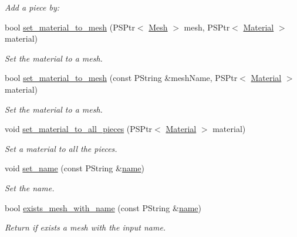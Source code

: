 \begin{DoxyCompactItemize}
\begin{DoxyCompactList}\small\item\em Add a piece by\+: \end{DoxyCompactList}\item 
bool \mbox{\hyperlink{classprz_1_1_model_ac68a6c012bdcaf9a24c275f7acf081bf}{set\+\_\+material\+\_\+to\+\_\+mesh}} (P\+S\+Ptr$<$ \mbox{\hyperlink{classprz_1_1_mesh}{Mesh}} $>$ mesh, P\+S\+Ptr$<$ \mbox{\hyperlink{classprz_1_1_material}{Material}} $>$ material)
\begin{DoxyCompactList}\small\item\em Set the material to a mesh. \end{DoxyCompactList}\item 
bool \mbox{\hyperlink{classprz_1_1_model_a8ce72cf9e0f9df5dcf760e1ff748e8cc}{set\+\_\+material\+\_\+to\+\_\+mesh}} (const P\+String \&mesh\+Name, P\+S\+Ptr$<$ \mbox{\hyperlink{classprz_1_1_material}{Material}} $>$ material)
\begin{DoxyCompactList}\small\item\em Set the material to a mesh. \end{DoxyCompactList}\item 
void \mbox{\hyperlink{classprz_1_1_model_aceccc8a7ed45ff2b0328f2bd68552aa6}{set\+\_\+material\+\_\+to\+\_\+all\+\_\+pieces}} (P\+S\+Ptr$<$ \mbox{\hyperlink{classprz_1_1_material}{Material}} $>$ material)
\begin{DoxyCompactList}\small\item\em Set a material to all the pieces. \end{DoxyCompactList}\item 
void \mbox{\hyperlink{classprz_1_1_model_a553159d0e6db23fa478e2c84ddc20358}{set\+\_\+name}} (const P\+String \&\mbox{\hyperlink{classprz_1_1_model_aa9a4c5370ebe94b8d34c83e7b6317239}{name}})
\begin{DoxyCompactList}\small\item\em Set the name. \end{DoxyCompactList}\item 
bool \mbox{\hyperlink{classprz_1_1_model_aa13ec4e2bc7c299f10806ced907eb198}{exists\+\_\+mesh\+\_\+with\+\_\+name}} (const P\+String \&\mbox{\hyperlink{classprz_1_1_model_aa9a4c5370ebe94b8d34c83e7b6317239}{name}})
\begin{DoxyCompactList}\small\item\em Return if exists a mesh with the input name. \end{DoxyCompactList}\item 

\end{DoxyCompactItemize}
